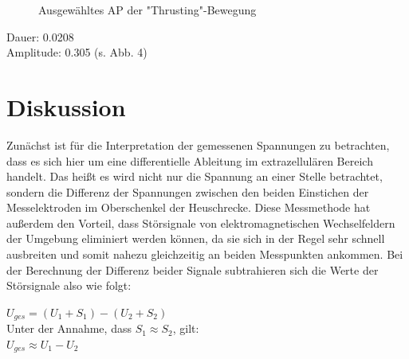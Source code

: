 \begin{figure}[H]
\caption{Ausgewähltes AP der "{}Thrusting"{}-Bewegung}
\label{thrust-ap}
\end{figure}



Dauer: 0.0208\\
Amplitude: 0.305 (s. Abb. 4)

\section{Diskussion}
Zunächst ist für die Interpretation der gemessenen Spannungen zu betrachten, dass es sich hier um eine differentielle Ableitung im extrazellulären Bereich handelt. Das heißt es wird nicht nur die Spannung an einer Stelle betrachtet, sondern die Differenz der Spannungen zwischen den beiden Einstichen der Messelektroden im Oberschenkel der Heuschrecke. Diese Messmethode hat außerdem den Vorteil, dass Störsignale von elektromagnetischen Wechselfeldern der Umgebung eliminiert werden können, da sie sich in der Regel sehr schnell ausbreiten und somit nahezu gleichzeitig an beiden Messpunkten ankommen. Bei der Berechnung der Differenz beider Signale subtrahieren sich die Werte der Störsignale also wie folgt:
\begin{center}
$U_{ges}= (U_1+S_1) - (U_2 + S_2)$ \\

Unter der Annahme, dass $S_1 \approx S_2$, gilt: \\

$U_{ges} \approx U_1 - U_2$
\end{center}

